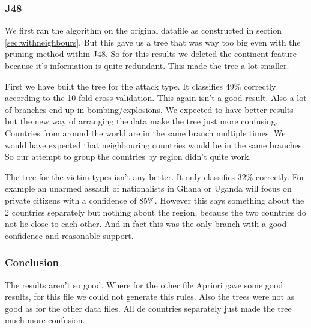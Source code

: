 \documentclass[a4]{article}
\begin{document}
\subsubsection{J48}
We first ran the algorithm on the original datafile as constructed in section \ref{sec:withneighbours}. But this gave us a tree that was way too big even with the pruning method within J48. So for this results we deleted the continent feature because it's information is quite redundant. This made the tree a lot smaller.\par
First we have built the tree for the attack type. It classifies 49\% correctly according to the 10-fold cross validation. This again isn't a good result. Also a lot of branches end up in bombing/explosions. We expected to have better results but the new way of arranging the data make the tree just more confusing. Countries from around the world are in the same branch multiple times. We would have expected that neighbouring countries would be in the same branches. So our attempt to group the countries by region didn't quite work.\par
The tree for the victim types isn't any better. It only classifies 32\% correctly. For example an unarmed assault of nationalists in Ghana or Uganda will focus on private citizens with a confidence of 85\%. However this says something about the 2 countries separately but nothing about the region, because the two countries do not lie close to each other. And in fact this was the only branch with a good confidence and reasonable support.
\subsubsection{Conclusion}
The results aren't so good. Where for the other file Apriori gave some good results, for this file we could not generate this rules. Also the trees were not as good as for the other data files. All de countries separately just made the tree much more confusion.
\end{document}
